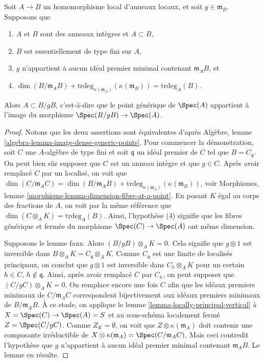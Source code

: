 \begin{lemma}
\label{lemma-horizontal}
Soit $A \to B$ un homomorphisme local d'anneaux locaux, et soit
$g \in \mathfrak m_B$. Supposons que
\begin{enumerate}
\item $A$ et $B$ sont des anneaux intègres et $A \subset B$,
\item $B$ est essentiellement de type fini sur $A$,
\item $g$ n'appartient à aucun idéal premier minimal contenant $\mathfrak m_AB$, et
\item $\dim(B/\mathfrak m_AB) +
\text{trdeg}_{\kappa(\mathfrak m_A)}(\kappa(\mathfrak m_B)) =
\text{trdeg}_A(B)$.
\end{enumerate}
Alors $A \subset B/gB$, c'est-à-dire que le point générique de $\Spec(A)$
appartient à l'image du morphisme $\Spec(B/gB) \to \Spec(A)$.
\end{lemma}

\begin{proof}
Notons que les deux assertions sont équivalentes d'après
Algèbre, lemme \ref{algebra-lemma-image-dense-generic-points}.
Pour commencer la démonstration, soit $C$ une $A$-algèbre de type fini
et soit $\mathfrak q$ un idéal premier de $C$ tel que $B = C_{\mathfrak q}$.
On peut bien sûr supposer que $C$ est un anneau intègre et que $g \in C$.
Après avoir remplacé $C$ par un localisé, on voit que
$\dim(C/\mathfrak m_AC) = \dim(B/\mathfrak m_AB) +
\text{trdeg}_{\kappa(\mathfrak m_A)}(\kappa(\mathfrak m_B))$, voir
Morphismes, lemme \ref{morphisms-lemma-dimension-fibre-at-a-point}.
En posant $K$ égal au corps des fractions de $A$,
on voit par la même référence que
$\dim(C \otimes_A K) = \text{trdeg}_A(B)$. Ainsi, l'hypothèse
(4) signifie que les fibres générique et fermée du morphisme
$\Spec(C) \to \Spec(A)$ ont même dimension.

\medskip\noindent
Supposons le lemme faux. Alors $(B/gB) \otimes_A K = 0$.
Cela signifie que $g \otimes 1$ est inversible dans $B \otimes_A K
= C_{\mathfrak q} \otimes_A K$. Comme $C_{\mathfrak q}$ est une limite
de localisés principaux, on conclut que $g \otimes 1$
est inversible dans $C_h \otimes_A K$ pour un certain
$h \in C$, $h \not \in \mathfrak q$. Ainsi, après avoir remplacé $C$
par $C_h$, on peut supposer que $(C/gC) \otimes_A K = 0$.
On remplace encore une fois $C$ afin que les idéaux premiers minimaux
de $C/\mathfrak m_AC$ correspondent bijectivement aux idéaux premiers minimaux
de $B/\mathfrak m_AB$. À ce stade, on applique
le lemme \ref{lemma-locally-principal-vertical}
à $X = \Spec(C) \to \Spec(A) = S$ et au sous-schéma localement fermé
$Z = \Spec(C/gC)$. Comme $Z_K = \emptyset$, on voit que
$Z \otimes \kappa(\mathfrak m_A)$ doit contenir une composante irréductible
de
$X \otimes \kappa(\mathfrak m_A) = \Spec(C/\mathfrak m_AC)$.
Mais ceci contredit l'hypothèse que $g$ n'appartient
à aucun idéal premier minimal contenant $\mathfrak m_AB$. Le lemme en résulte.
\end{proof}

